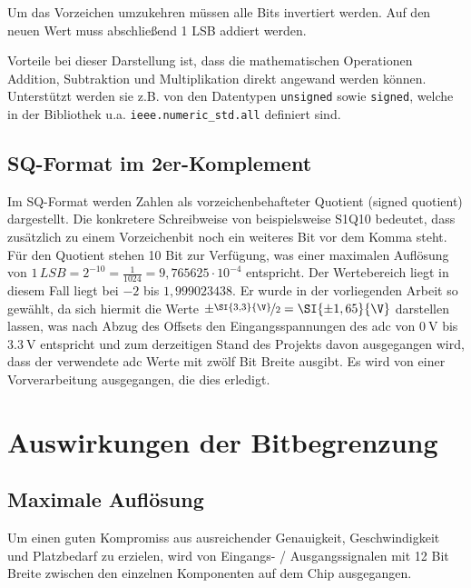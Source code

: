 Um das Vorzeichen umzukehren müssen alle Bits invertiert werden. Auf den neuen Wert muss abschließend 1 LSB addiert werden.

Vorteile bei dieser Darstellung ist, dass die mathematischen Operationen Addition, Subtraktion und Multiplikation direkt angewand werden können. Unterstützt werden sie z.B. 
von den Datentypen \texttt{unsigned} sowie \texttt{signed}, welche in der Bibliothek u.a. \texttt{ieee.numeric\_std.all} definiert sind.




\subsection{SQ-Format im 2er-Komplement}

Im SQ-Format werden Zahlen als vorzeichenbehafteter Quotient (signed quotient) dargestellt. Die konkretere Schreibweise von beispielsweise S1Q10 bedeutet, dass zusätzlich zu
einem Vorzeichenbit noch ein weiteres Bit vor dem Komma steht. Für den Quotient stehen 10 Bit zur Verfügung, was einer maximalen Auflösung  von 
$1\,LSB = 2^{-10} = \frac{1}{1024} = 9,765625\cdot10^{-4}$ entspricht. Der Wertebereich liegt in diesem Fall liegt bei $-2$ bis $1,999023438$. Er wurde in der vorliegenden 
Arbeit so gewählt, da sich hiermit die Werte $\pm\nicefrac{\SI{3,3}{\V}}{2} = \SI{\pm1,65}{\V}$ darstellen lassen, was nach Abzug des Offsets den Eingangsspannungen des \gls{adc}
von $\SI{0}{\V}$ bis $\SI{3,3}{\V}$ entspricht und zum derzeitigen Stand des Projekts davon ausgegangen wird, dass der verwendete \gls{adc} Werte mit zwölf Bit Breite ausgibt. 
Es wird von einer Vorverarbeitung ausgegangen, die dies erledigt.




\section{Auswirkungen der Bitbegrenzung}
\subsection{Maximale Auflösung}

Um einen guten Kompromiss aus ausreichender Genauigkeit, Geschwindigkeit und Platzbedarf zu erzielen, wird von Eingangs- / Ausgangssignalen mit 12 Bit Breite zwischen
den einzelnen Komponenten auf dem Chip ausgegangen.

